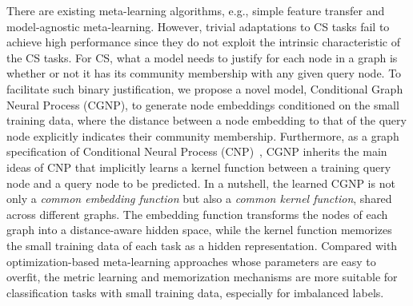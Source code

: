 \documentclass[conference]{IEEEtran}
\begin{document}
There are existing meta-learning algorithms, e.g., simple feature
transfer and model-agnostic meta-learning. However, trivial
adaptations to CS tasks fail to achieve high performance since they do
not exploit the intrinsic characteristic of the CS tasks.  For CS,
what a model needs to justify for each node in a graph is whether or
not it has its community membership with any given query node.  To
facilitate such binary justification, we propose a novel model,
Conditional Graph Neural Process (CGNP), to generate node embeddings
conditioned on the small training data, where the distance between a
node embedding to that of the query node explicitly indicates their
community membership.  Furthermore, as a graph specification of
Conditional Neural Process (CNP)~\cite{CNP}, CGNP inherits the main
ideas of CNP that implicitly learns a kernel function between a
training query node and a query node to be predicted.  
In a nutshell, the learned CGNP is not only a \emph{common embedding
  function} but also a \emph{common kernel function}, shared across
different graphs. The embedding function transforms the nodes of each
graph into a distance-aware hidden space, while the kernel function
memorizes the small training data of each task as a hidden
representation.  Compared with optimization-based meta-learning
approaches whose parameters are easy to overfit, the metric learning
and memorization mechanisms are more suitable for classification tasks
with small training data, especially for imbalanced labels.
%
%
%
\end{document}
